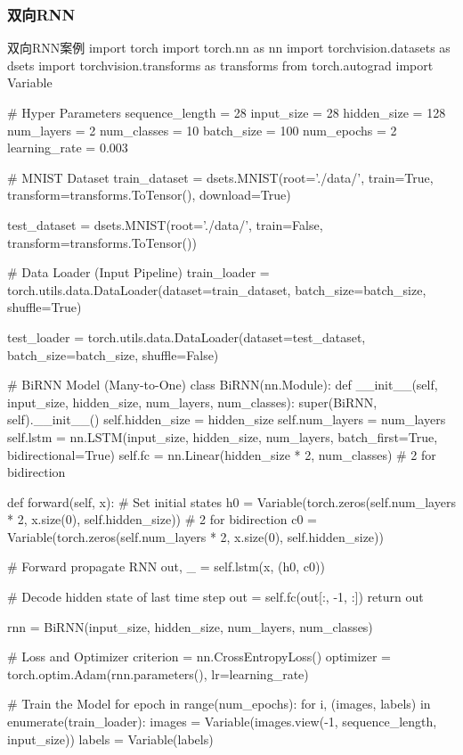 \documentclass[openbib]{article}
\begin{document}
\subsubsection{双向RNN}
\begin{Python}{双向RNN案例}
	import torch
	import torch.nn as nn
	import torchvision.datasets as dsets
	import torchvision.transforms as transforms
	from torch.autograd import Variable
	
	# Hyper Parameters
	sequence_length = 28
	input_size = 28
	hidden_size = 128
	num_layers = 2
	num_classes = 10
	batch_size = 100
	num_epochs = 2
	learning_rate = 0.003
	
	# MNIST Dataset
	train_dataset = dsets.MNIST(root='./data/',
	train=True,
	transform=transforms.ToTensor(),
	download=True)
	
	test_dataset = dsets.MNIST(root='./data/',
	train=False,
	transform=transforms.ToTensor())
	
	# Data Loader (Input Pipeline)
	train_loader = torch.utils.data.DataLoader(dataset=train_dataset,
	batch_size=batch_size,
	shuffle=True)
	
	test_loader = torch.utils.data.DataLoader(dataset=test_dataset,
	batch_size=batch_size,
	shuffle=False)
	
	
	# BiRNN Model (Many-to-One)
	class BiRNN(nn.Module):
	def __init__(self, input_size, hidden_size, num_layers, num_classes):
	super(BiRNN, self).__init__()
	self.hidden_size = hidden_size
	self.num_layers = num_layers
	self.lstm = nn.LSTM(input_size, hidden_size, num_layers,
	batch_first=True, bidirectional=True)
	self.fc = nn.Linear(hidden_size * 2, num_classes)  # 2 for bidirection
	
	def forward(self, x):
	# Set initial states
	h0 = Variable(torch.zeros(self.num_layers * 2, x.size(0), self.hidden_size))  # 2 for bidirection
	c0 = Variable(torch.zeros(self.num_layers * 2, x.size(0), self.hidden_size))
	
	# Forward propagate RNN
	out, _ = self.lstm(x, (h0, c0))
	
	# Decode hidden state of last time step
	out = self.fc(out[:, -1, :])
	return out
	
	
	rnn = BiRNN(input_size, hidden_size, num_layers, num_classes)
	
	# Loss and Optimizer
	criterion = nn.CrossEntropyLoss()
	optimizer = torch.optim.Adam(rnn.parameters(), lr=learning_rate)
	
	# Train the Model
	for epoch in range(num_epochs):
	for i, (images, labels) in enumerate(train_loader):
	images = Variable(images.view(-1, sequence_length, input_size))
	labels = Variable(labels)
	

\end{Python}
\end{document}
